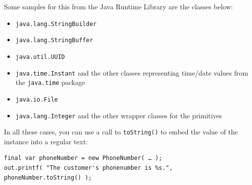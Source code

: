 Some samples for this from the Java Runtime Library are the classes below:
\begin{itemize}
\item\lstinline|java.lang.StringBuilder|\autocite{ORACLE_DOC_STRINGBUILDER_CLASS}
\item\lstinline|java.lang.StringBuffer|\autocite{ORACLE_DOC_STRINGBUFFER_CLASS}
\item\lstinline|java.util.UUID|\autocite{ORACLE_DOC_UUID_CLASS}
\item\lstinline|java.time.Instant|\autocite{ORACLE_DOC_INSTANT_CLASS} and the other classes representing time/date values from the \lstinline|java.time| package\autocite{ORACLE_DOC_TIME_PACKAGE}
\item\lstinline|java.io.File|\autocite{ORACLE_DOC_FILE_CLASS}
\item\lstinline|java.lang.Integer|\autocite{ORACLE_DOC_INTEGER_CLASS} and the other wrapper classes for the primitives
\end{itemize}

In all these cases, you can use a call to \lstinline|toString()| to embed the value of the instance into a regular text:
\begin{lstlisting}
final var phoneNumber = new PhoneNumber( … );
out.printf( "The customer's phonenumber is %s.", phoneNumber.toString() );
\end{lstlisting}

